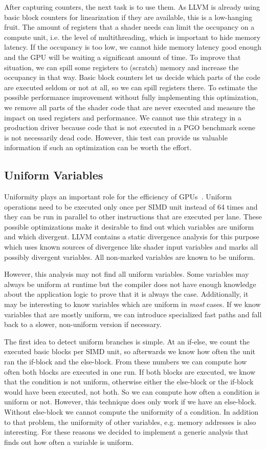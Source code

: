 After capturing counters, the next task is to use them. As LLVM is already using basic block counters for linearization if they are available, this is a low-hanging fruit.
The amount of registers that a shader needs can limit the occupancy on a compute unit, i.e. the level of multithreading, which is important to hide memory latency.
If the occupancy is too low, we cannot hide memory latency good enough and the GPU will be waiting a significant amount of time.
To improve that situation, we can spill some registers to (scratch) memory and increase the occupancy in that way.
Basic block counters let us decide which parts of the code are executed seldom or not at all, so we can spill registers there.
To estimate the possible performance improvement without fully implementing this optimization, we remove all parts of the shader code that are never executed and measure the impact on used registers and performance.
We cannot use this strategy in a production driver because code that is not executed in a PGO benchmark scene is not necessarily dead code. However, this test can provide us valuable information if such an optimization can be worth the effort.

\subsection{Uniform Variables}
\label{sub:uniformity}
Uniformity plays an important role for the efficiency of GPUs~\cite{Chen2016}. Uniform operations need to be executed only once per SIMD unit instead of 64 times and they can be run in parallel to other instructions that are executed per lane. These possible optimizations make it desirable to find out which variables are uniform and which divergent. LLVM contains a static divergence analysis for this purpose which uses known sources of divergence like shader input variables and marks all possibly divergent variables. All non-marked variables are known to be uniform.

However, this analysis may not find all uniform variables. Some variables may always be uniform at runtime but the compiler does not have enough knowledge about the application logic to prove that it is always the case. Additionally, it may be interesting to know variables which are uniform in \emph{most} cases. If we know variables that are mostly uniform, we can introduce specialized fast paths and fall back to a slower, non-uniform version if necessary.

The first idea to detect uniform branches is simple. At an if-else, we count the executed basic blocks per SIMD unit, so afterwards we know how often the unit ran the if-block and the else-block. From these numbers we can compute how often both blocks are executed in one run.
If both blocks are executed, we know that the condition is not uniform, otherwise either the else-block or the if-block would have been executed, not both. So we can compute how often a condition is uniform or not.
However, this technique does only work if we have an else-block. Without else-block we cannot compute the uniformity of a condition. In addition to that problem, the uniformity of other variables, e.g. memory addresses is also interesting.
For these reasons we decided to implement a generic analysis that finds out how often a variable is uniform.
